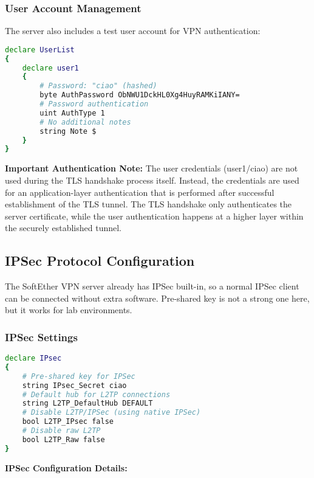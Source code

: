 \subsubsection{User Account Management}

The server also includes a test user account for VPN authentication:

\begin{lstlisting}[language=bash]
declare UserList
{
    declare user1
    {
        # Password: "ciao" (hashed)
        byte AuthPassword ObNWU1DckHL0Xg4HuyRAMKiIANY= 
        # Password authentication   
        uint AuthType 1                    
        # No additional notes              
        string Note $                                                    
    }
}
\end{lstlisting}

\textbf{Important Authentication Note:} The user credentials (user1/ciao) are not used during the TLS handshake process itself. Instead, the credentials are used for an application-layer authentication that is performed after successful establishment of the TLS tunnel. The TLS handshake only authenticates the server certificate, while the user authentication happens at a higher layer within the securely established tunnel.

\subsection{IPSec Protocol Configuration}

The SoftEther VPN server already has IPSec built-in, so a normal IPSec client can be connected without extra software. Pre-shared key is not a strong one here, but it works for lab environments.

\subsubsection{IPSec Settings}

\begin{lstlisting}[language=bash]
declare IPsec
{               
    # Pre-shared key for IPSec  
    string IPsec_Secret ciao                   
    # Default hub for L2TP connections
    string L2TP_DefaultHub DEFAULT    
    # Disable L2TP/IPSec (using native IPSec)         
    bool L2TP_IPsec false                      
    # Disable raw L2TP
    bool L2TP_Raw false                        
}
\end{lstlisting}

\textbf{IPSec Configuration Details:}

